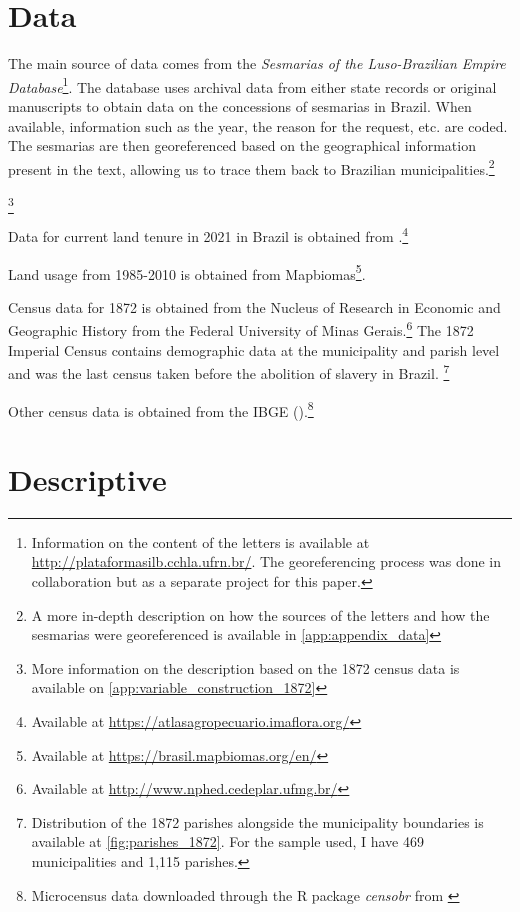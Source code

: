 \documentclass{article}
\begin{document}
\section{Data}

The main source of data comes from the \textit{Sesmarias of the Luso-Brazilian Empire Database}\footnote{
  Information on the content of the letters is available at \url{http://plataformasilb.cchla.ufrn.br/}. The georeferencing process was done in collaboration but as a separate project for this paper.}.
The database uses archival data from either state records or original manuscripts to obtain data on the concessions of sesmarias in Brazil. 
When available, information such as the year, the reason for the request, etc. are coded. 
The sesmarias are then georeferenced based on the geographical information present in the text, allowing us to trace them back to Brazilian municipalities.\footnote{A more in-depth description on how the sources of the letters and how the sesmarias were georeferenced is available in \autoref{app:appendix_data}}

\footnote{More information on the description based on the 1872 census data is available on \autoref{app:variable_construction_1872}}

Data for current land tenure in 2021 in Brazil is obtained from \textcite{Sparovek2019-dn}.\footnote{
  Available at \url{https://atlasagropecuario.imaflora.org/}}

Land usage from 1985-2010 is obtained from Mapbiomas\textcite{Souza2020-kb}\footnote{
  Available at \url{https://brasil.mapbiomas.org/en/}}.

Census data for 1872 is obtained from the Nucleus of Research in Economic and Geographic History from the Federal University of Minas Gerais.\footnote{
  Available at \url{http://www.nphed.cedeplar.ufmg.br/}}
The 1872 Imperial Census contains demographic data at the municipality and parish level and was the last census taken before the abolition of slavery in Brazil. \footnote{Distribution of the 1872 parishes alongside the municipality boundaries is available at \autoref{fig:parishes_1872}. For the sample used, I have 469 municipalities and 1,115 parishes.}

Other census data is obtained from the IBGE (\textit{}).\footnote{Microcensus data downloaded through the R package \textit{censobr} from \textcite{Pereira2023-qv}}

\section{Descriptive}
\end{document}
